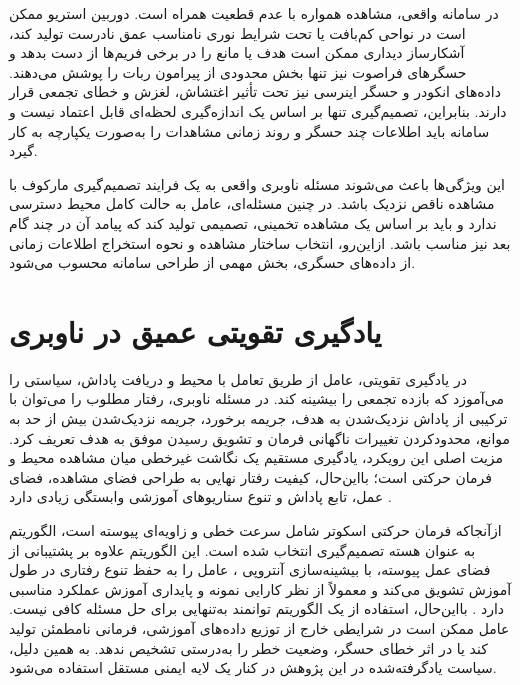 در سامانه واقعی، مشاهده همواره با عدم قطعیت همراه است. دوربین استریو ممکن است در نواحی کم‌بافت یا تحت شرایط نوری نامناسب عمق نادرست تولید کند، آشکارساز دیداری ممکن است هدف یا مانع را در برخی فریم‌ها از دست بدهد و حسگرهای فراصوت نیز تنها بخش محدودی از پیرامون ربات را پوشش می‌دهند. داده‌های انکودر و حسگر اینرسی نیز تحت تأثیر اغتشاش، لغزش و خطای تجمعی قرار دارند. بنابراین، تصمیم‌گیری تنها بر اساس یک اندازه‌گیری لحظه‌ای قابل اعتماد نیست و سامانه باید اطلاعات چند حسگر و روند زمانی مشاهدات را به‌صورت یکپارچه به کار گیرد.

این ویژگی‌ها باعث می‌شوند مسئله ناوبری واقعی به یک فرایند تصمیم‌گیری مارکوف با مشاهده ناقص%
 نزدیک باشد. در چنین مسئله‌ای، عامل به حالت کامل محیط دسترسی ندارد و باید بر اساس یک مشاهده تخمینی، تصمیمی تولید کند که پیامد آن در چند گام بعد نیز مناسب باشد. ازاین‌رو، انتخاب ساختار مشاهده و نحوه استخراج اطلاعات زمانی از داده‌های حسگری، بخش مهمی از طراحی سامانه محسوب می‌شود.

\section{یادگیری تقویتی عمیق در ناوبری}

در یادگیری تقویتی، عامل از طریق تعامل با محیط و دریافت پاداش، سیاستی را می‌آموزد که بازده تجمعی را بیشینه کند. در مسئله ناوبری، رفتار مطلوب را می‌توان با ترکیبی از پاداش نزدیک‌شدن به هدف، جریمه برخورد، جریمه نزدیک‌شدن بیش از حد به موانع، محدودکردن تغییرات ناگهانی فرمان و تشویق رسیدن موفق به هدف تعریف کرد. مزیت اصلی این رویکرد، یادگیری مستقیم یک نگاشت غیرخطی میان مشاهده محیط و فرمان حرکتی است؛ بااین‌حال، کیفیت رفتار نهایی به طراحی فضای مشاهده، فضای عمل، تابع پاداش و تنوع سناریوهای آموزشی وابستگی زیادی دارد \cite{Kober2013RLRobotics,Le2024DRLNavigationSurvey}.

ازآنجاکه فرمان حرکتی اسکوتر شامل سرعت خطی و زاویه‌ای پیوسته است، الگوریتم  به عنوان هسته تصمیم‌گیری انتخاب شده است. این الگوریتم علاوه بر پشتیبانی از فضای عمل پیوسته، با بیشینه‌سازی آنتروپی%
، عامل را به حفظ تنوع رفتاری در طول آموزش تشویق می‌کند و معمولاً از نظر کارایی نمونه و پایداری آموزش عملکرد مناسبی دارد \cite{Haarnoja2018SAC}. بااین‌حال، استفاده از یک الگوریتم توانمند به‌تنهایی برای حل مسئله کافی نیست. عامل ممکن است در شرایطی خارج از توزیع داده‌های آموزشی، فرمانی نامطمئن تولید کند یا در اثر خطای حسگر، وضعیت خطر را به‌درستی تشخیص ندهد. به همین دلیل، سیاست یادگرفته‌شده در این پژوهش در کنار یک لایه ایمنی مستقل استفاده می‌شود.

